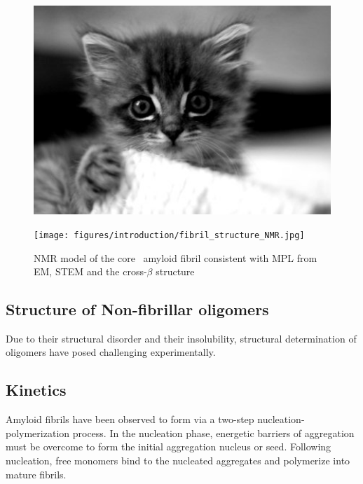     \begin{figure}
      \centering
      \includegraphics[width=6in]{figures/introduction/fibril_structure_diffraction.jpg}
      \caption[Characteristic cross-$\beta$ spacings from X-ray fibre diffraction studies of amyloid fibrils]{}
      \label{fig:fibril_diffraction}
    \end{figure}

    \begin{figure}
      \centering
      \texttt{[image: figures/introduction/fibril\_structure\_NMR.jpg]}
      \caption[Blah]{NMR model of the core \abeta\ amyloid fibril consistent with MPL from EM, STEM and the cross-$\beta$ structure}
      \label{fig:NMR_fibril_model}
    \end{figure}
  
  \subsection{Structure of Non-fibrillar oligomers}
   Due to their structural disorder and their insolubility, structural determination of oligomers have posed challenging experimentally.
	
  \subsection{Kinetics}
  Amyloid fibrils have been observed to form via a two-step nucleation-polymerization process. In the nucleation phase, energetic barriers of aggregation must be overcome to form the initial aggregation nucleus or seed.  Following nucleation, free monomers bind to the nucleated aggregates and polymerize into mature fibrils.\cite{Murphy:2002fe}
    
